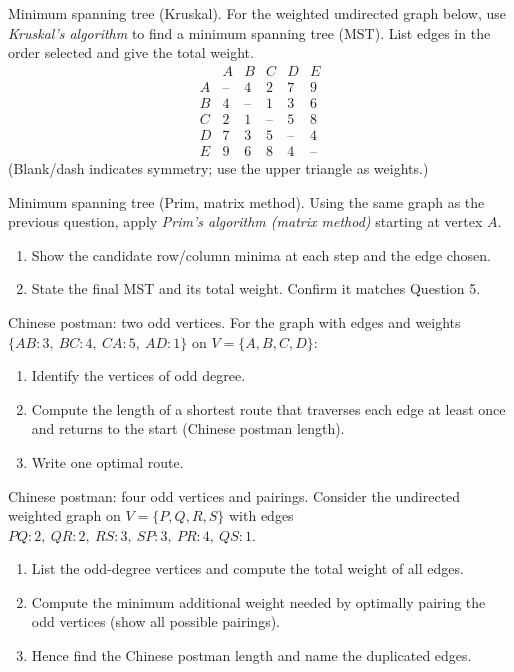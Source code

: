 \documentclass[11pt]{article}
\def\textbf#1{#1}%
\newcounter{question}
\begin{document}
\begin{question}
\textbf{Minimum spanning tree (Kruskal).}
For the weighted undirected graph below, use \emph{Kruskal’s algorithm} to find a minimum spanning tree (MST). List edges in the order selected and give the total weight.
\[
\begin{array}{c|ccccc}
  & A & B & C & D & E\\\hline
A & \text{--} & 4 & 2 & 7 & 9\\
B & 4 & \text{--} & 1 & 3 & 6\\
C & 2 & 1 & \text{--} & 5 & 8\\
D & 7 & 3 & 5 & \text{--} & 4\\
E & 9 & 6 & 8 & 4 & \text{--}
\end{array}
\]
(Blank/dash indicates symmetry; use the upper triangle as weights.)
\end{question}

\begin{question}
\textbf{Minimum spanning tree (Prim, matrix method).}
Using the same graph as the previous question, apply \emph{Prim’s algorithm (matrix method)} starting at vertex $A$.
\begin{enumerate}
  \item Show the candidate row/column minima at each step and the edge chosen.
  \item State the final MST and its total weight. Confirm it matches Question 5.
\end{enumerate}
\end{question}

\begin{question}
\textbf{Chinese postman: two odd vertices.}
For the graph with edges and weights $\{AB\!:\!3,\ BC\!:\!4,\ CA\!:\!5,\ AD\!:\!1\}$ on $V=\{A,B,C,D\}$:
\begin{enumerate}
  \item Identify the vertices of odd degree.
  \item Compute the length of a shortest route that traverses each edge at least once and returns to the start (Chinese postman length).
  \item Write one optimal route.
\end{enumerate}
\end{question}

\begin{question}
\textbf{Chinese postman: four odd vertices and pairings.}
Consider the undirected weighted graph on $V=\{P,Q,R,S\}$ with edges
$PQ\!:\!2,\ QR\!:\!2,\ RS\!:\!3,\ SP\!:\!3,\ PR\!:\!4,\ QS\!:\!1$.
\begin{enumerate}
  \item List the odd-degree vertices and compute the total weight of all edges.
  \item Compute the minimum additional weight needed by optimally pairing the odd vertices (show all possible pairings).
  \item Hence find the Chinese postman length and name the duplicated edges.
\end{enumerate}
\end{question}
\end{document}
